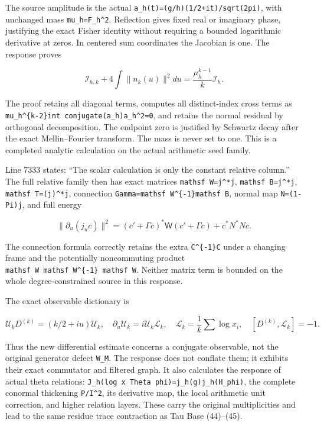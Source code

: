 The source amplitude is the actual
\texttt{a\_h(t)=(g/h)(1/2+it)/sqrt(2pi)}, with unchanged mass
\texttt{mu\_h=\textbar{}\textbar{}F\_h\textbar{}\textbar{}\^{}2}.
Reflection gives fixed real or imaginary phase, justifying the exact
Fisher identity without requiring a bounded logarithmic derivative at
zeros. In centered sum coordinates the Jacobian is one. The response
proves

\[
\mathcal I_{h,k}+4\int\|n_k(u)\|^2du
=\frac{\mu_h^{k-1}}{k}\mathcal I_h.
\]

The proof retains all diagonal terms, computes all distinct-index cross
terms as
\texttt{mu\_h\^{}\{k-2\}\textbar{}int\ conjugate(a\_h)a\_h\textquotesingle{}\textbar{}\^{}2=0},
and retains the normal residual by orthogonal decomposition. The
endpoint zero is justified by Schwartz decay after the exact
Mellin--Fourier transform. The mass is never set to one. This is a
completed analytic calculation on the actual arithmetic seed family.

Line 7333 states: ``The scalar calculation is only the constant relative
column.'' The full relative family then has exact matrices
\texttt{mathsf\ W=j\^{}*j},
\texttt{mathsf\ B=j\^{}*j\textquotesingle{}},
\texttt{mathsf\ T=(j\textquotesingle{})\^{}*j\textquotesingle{}},
connection \texttt{Gamma=mathsf\ W\^{}\{-1\}mathsf\ B}, normal map
\texttt{N=(1-Pi)j\textquotesingle{}}, and full energy

\[
\|\partial_u(j_uc)\|^2
=(c'+\Gamma c)^*\mathsf W(c'+\Gamma c)+c^*N^*Nc.
\]

The connection formula correctly retains the extra
\texttt{C\^{}\{-1\}C\textquotesingle{}} under a changing frame and the
potentially noncommuting product
\texttt{mathsf\ W\textquotesingle{}\ mathsf\ W\^{}\{-1\}\ mathsf\ W\textquotesingle{}}.
Neither matrix term is bounded on the whole degree-constrained source in
this response.

The exact observable dictionary is

\[
\mathscr U_kD^{(k)}=(k/2+iu)\mathscr U_k,\quad
\partial_u\mathscr U_k=i\mathscr U_k\mathscr L_k,\quad
\mathscr L_k=\frac1k\sum\log x_i,\quad
[D^{(k)},\mathscr L_k]=-1.
\]

Thus the new differential estimate concerns a conjugate observable, not
the original generator defect \texttt{W\_M}. The response does not
conflate them; it exhibits their exact commutator and filtered graph. It
also calculates the response of actual theta relations:
\texttt{J\_h(log\ x\ Theta\ phi)=j\_h(g\textquotesingle{})j\_h(H\_phi)},
the complete conormal thickening \texttt{P/I\^{}2}, its derivative map,
the local arithmetic unit correction, and higher relation layers. These
carry the original multiplicities and lead to the same residue trace
contraction as Tau Base (44)--(45).

